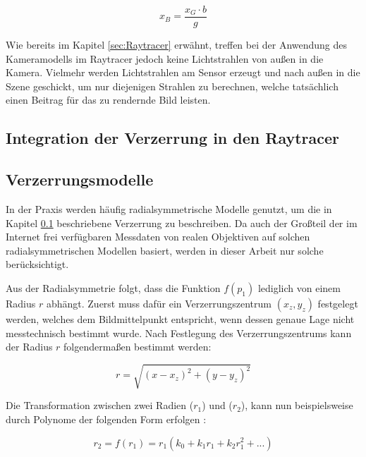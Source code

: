 \begin{equation}
x_B = \frac{x_G \cdot b}{g}
\end{equation}

Wie bereits im Kapitel \ref{sec:Raytracer} erwähnt, treffen bei der Anwendung des Kameramodells im Raytracer jedoch keine Lichtstrahlen von außen in die Kamera. Vielmehr werden Lichtstrahlen am Sensor erzeugt und nach außen in die Szene geschickt, um nur diejenigen Strahlen zu berechnen, welche tatsächlich einen Beitrag für das zu rendernde Bild leisten.

\subsection{Integration der Verzerrung in den Raytracer}\label{sec:DistortionRaytracer}



\subsection{Verzerrungsmodelle}
\label{subsec:verzerrungsmodelle}

In der Praxis werden häufig radialsymmetrische Modelle genutzt, um die in Kapitel \ref{sec:DistortionRaytracer} beschriebene Verzerrung zu beschreiben. Da auch der Großteil der im Internet frei verfügbaren Messdaten von realen Objektiven auf solchen radialsymmetrischen Modellen basiert, werden in dieser Arbeit nur solche berücksichtigt.

Aus der Radialsymmetrie folgt, dass die Funktion $f(p_1)$ lediglich von einem Radius $r$ abhängt. Zuerst muss dafür ein Verzerrungszentrum $(x_z, y_z)$ festgelegt werden, welches dem Bildmittelpunkt entspricht, wenn dessen genaue Lage nicht messtechnisch bestimmt wurde. Nach Festlegung des Verzerrungszentrums kann der Radius $r$ folgendermaßen bestimmt werden:

\begin{equation}
r = \sqrt{(x- x_z)^2 + (y-y_z)^2}
\end{equation}

Die Transformation zwischen zwei Radien ($r_1$) und ($r_2$), kann nun beispielsweise durch Polynome der folgenden Form erfolgen \cite{TangDistortionModels}:

\begin{equation}
r_2 = f(r_1) = r_1 (k_0 + k_1r_1 + k_2r_1^2 + ...)
\label{eq:PolyRadial}
\end{equation}

